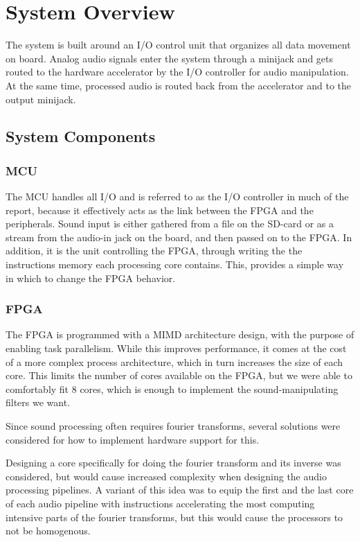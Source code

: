 \section{System Overview}

The system is built around an I/O control unit that organizes all data movement
on board. Analog audio signals enter the system through a minijack and gets
routed to the hardware accelerator by the I/O controller for audio manipulation.
At the same time, processed audio is routed back from the accelerator and to the
output minijack.

\subsection{System Components}
\subsubsection{MCU}\label{intro:system-components-mcu}

The MCU handles all I/O and is referred to as the I/O controller in much of the
report, because it effectively acts as the link between the FPGA and the
peripherals. Sound input is either gathered from a file on the SD-card or as a
stream from the audio-in jack on the board, and then passed on to the FPGA. In
addition, it is the unit controlling the FPGA, through writing the the
instructions memory each processing core contains. This, provides a simple way
in which to change the FPGA behavior.

\subsubsection{FPGA}

The FPGA is programmed with a MIMD architecture design, with the purpose of
enabling task parallelism. While this improves performance, it comes at the cost
of a more complex process architecture, which in turn increases the size of each
core. This limits the number of cores available on the FPGA, but we were able to
comfortably fit 8 cores, which is enough to implement the sound-manipulating
filters we want.


Since sound processing often requires fourier transforms, several solutions were
considered for how to implement hardware support for this.

Designing a core specifically for doing the fourier transform and its inverse
was considered, but would cause increased complexity when designing the audio
processing pipelines. A variant of this idea was to equip the first and the last
core of each audio pipeline with instructions accelerating the most computing
intensive parts of the fourier transforms, but this would cause the processors
to not be homogenous.

